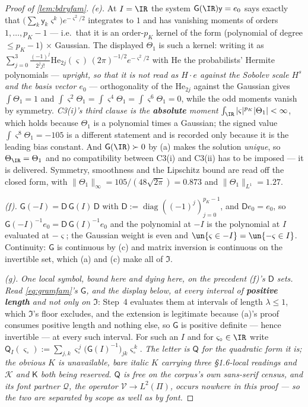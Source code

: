 \begin{proof}[Proof of \cref{lem:bdryfam}]
\emph{(e).} At $I=\IR$ the system $\mathsf G(\IR)\mathsf y=e_0$ says exactly that
$\big(\sum_k\mathsf y_k\varsigma^{k}\big)e^{-\varsigma^{2}/2}$ integrates to $1$ and has vanishing
moments of orders $1,\dots,p_K-1$ --- i.e.\ that it is an order-$p_K$ kernel of the form (polynomial of
degree $\le p_K-1$) $\times$ Gaussian. The displayed $\Theta_1$ is such a kernel: writing it as
$\sum_{j=0}^{3}\frac{(-1)^{j}}{2^{j}j!}\mathrm{He}_{2j}(\varsigma)\,(2\pi)^{-1/2}e^{-\varsigma^{2}/2}$ with
$\mathrm{He}$ the probabilists' Hermite polynomials --- \emph{upright, so that it is not read as
$H\cdot e$ against the Sobolev scale $H^{s}$ and the basis vector $e_0$} --- orthogonality of the
$\mathrm{He}_{2j}$ against the Gaussian gives
$\int\Theta_1=1$ and $\int\varsigma^{2}\Theta_1=\int\varsigma^{4}\Theta_1=\int\varsigma^{6}\Theta_1=0$,
while the odd moments vanish by symmetry. \emph{C3(i)'s third clause is the \textbf{absolute} moment}
$\int_\IR|\varsigma|^{p_K}|\Theta_1|<\infty$, which holds because $\Theta_1$ is a polynomial times a
Gaussian; the signed value $\int\varsigma^{8}\Theta_1=-105$ is a different statement and is recorded
only because it is the leading bias constant. And $\mathsf G(\IR)\succ0$ by (a) makes the solution \emph{unique}, so
$\Theta_\IR=\Theta_1$ and no compatibility between C3(i) and C3(ii) has to be imposed --- it is
delivered. Symmetry, smoothness and the Lipschitz bound are read off the closed form, with
$\|\Theta_1\|_\infty=105/(48\sqrt{2\pi})=0.873$ and $\|\Theta_1\|_{L^{1}}=1.27$.

\emph{(f).} $\mathsf G(-I)=\mathsf D\,\mathsf G(I)\,\mathsf D$ with $\mathsf D:=\operatorname{diag}((-1)^{j})_{j=0}^{p_K-1}$,
and $\mathsf De_0=e_0$, so $\mathsf G(-I)^{-1}e_0=\mathsf D\,\mathsf G(I)^{-1}e_0$ and the polynomial at
$-I$ is the polynomial at $I$ evaluated at $-\varsigma$; the Gaussian weight is even and
$\un\{\varsigma\in-I\}=\un\{-\varsigma\in I\}$. Continuity: $\mathsf G$ is continuous by (c) and matrix
inversion is continuous on the invertible set, which (a) and (c) make all of $\mathfrak I$.

\emph{(g).} \emph{One local symbol, bound here and dying here, on the precedent \textup{(f)}'s
$\mathsf D$ sets.} \emph{Read \eqref{eq:gramfam}'s $\mathsf G$, and the display below, at every interval
of \textbf{positive length} and not only on $\mathfrak I$}: Step~4 evaluates them at intervals of length
$\lambda\le1$, which $\mathfrak I$'s floor excludes, and the extension is legitimate because
\textup{(a)}'s proof consumes positive length and nothing else, so $\mathsf G$ is positive definite ---
hence invertible --- at every such interval. For such an $I$ and for $\varsigma_\circ\in\IR$ write
$\mathsf Q_I(\varsigma_\circ):=\sum_{j,k}\varsigma_\circ^{\,j}\big(\mathsf G(I)^{-1}\big)_{jk}
\varsigma_\circ^{\,k}$. \emph{The letter is $\mathsf Q$ for the quadratic form it is; the obvious $K$ is unavailable, bare
italic $K$ carrying three §1.6-local readings and $\mathcal K$ and $\mathsf K$ both being reserved.
$\mathsf Q$ is free on the corpus's own sans-serif census, and its font partner $\mathcal Q$, the
operator $\mathcal V\to L^{2}(\Pi)$, occurs nowhere in this proof --- so the two are separated by
scope as well as by font.}


\end{proof}

